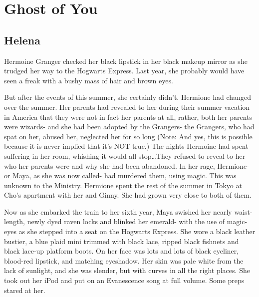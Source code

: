 \chapter{Ghost of You}

\section{Helena}



Hermoine Granger checked her black lipstick in her black makeup mirror as she trudged her way to the Hogwarts Express. Last year, she probably would have seen a freak with a bushy mass of hair and brown eyes.

\begin{sloppypar}
    But after the events of this summer, she certainly didn't. Hermione had changed over the summer. Her parents had revealed to her during their summer vacation in America that they were not in fact her parents at all, rather, both her parents were wizards- and she had been adopted by the Grangers- the Grangers, who had spat on her, abused her, neglected her for so long (Note: And yes, this is possible because it is never implied that it's NOT true.) The nights Hermoine had spent suffering in her room, whishing it would all stop…They refused to reveal to her who her parents were and why she had been abandoned. In her rage, Hermione- or Maya, as she was now called- had murdered them, using magic. This was unknown to the Ministry. Hermione spent the rest of the summer in Tokyo at Cho's apartment with her and Ginny. She had grown very close to both of them.
\end{sloppypar}

Now as she embarked the train to her sixth year, Maya swished her nearly waist-length, newly dyed raven locks and blinked her emerald- with the use of magic- eyes as she stepped into a seat on the Hogwarts Express. She wore a black leather bustier, a blue plaid mini trimmed with black lace, ripped black fishnets and black lace-up platform boots. On her face was lots and lots of black eyeliner, blood-red lipstick, and matching eyeshadow. Her skin was pale white from the lack of sunlight, and she was slender, but with curves in all the right places. She took out her iPod and put on an Evanescence song at full volume. Some preps stared at her.

